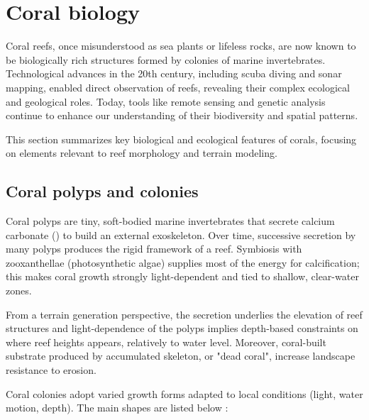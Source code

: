 \section{Coral biology}
\label{sec:state-of-the-art_biology}

Coral reefs, once misunderstood as sea plants or lifeless rocks, are now known to be biologically rich structures formed by colonies of marine invertebrates. Technological advances in the 20th century, including scuba diving and sonar mapping, enabled direct observation of reefs, revealing their complex ecological and geological roles. Today, tools like remote sensing and genetic analysis continue to enhance our understanding of their biodiversity and spatial patterns.

This section summarizes key biological and ecological features of corals, focusing on elements relevant to reef morphology and terrain modeling.


\subsection{Coral polyps and colonies}
Coral polyps are tiny, soft-bodied marine invertebrates that secrete calcium carbonate () to build an external exoskeleton. Over time, successive secretion by many polyps produces the rigid framework of a reef. Symbiosis with zooxanthellae (photosynthetic algae) supplies most of the energy for calcification; this makes coral growth strongly light-dependent and tied to shallow, clear-water zones. 

From a terrain generation perspective, the  secretion underlies the elevation of reef structures and light-dependence of the polyps implies depth-based constraints on where reef heights appears, relatively to water level. Moreover, coral-built substrate produced by accumulated skeleton, or "dead coral", increase landscape resistance to erosion.

Coral colonies adopt varied growth forms adapted to local conditions (light, water motion, depth). The main shapes are listed below :

